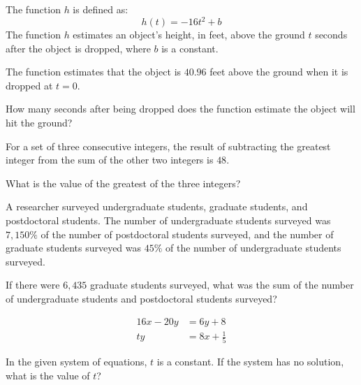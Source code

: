 \noindent\markforreview
\vspace{1em}

The function \(h\) is defined as:
\[
h(t) = -16t^2 + b
\]
The function \(h\) estimates an object's height, in feet, above the ground \(t\) seconds after the object is dropped, where \(b\) is a constant.

The function estimates that the object is \(40.96\) feet above the ground when it is dropped at \(t = 0\).

How many seconds after being dropped does the function estimate the object will hit the ground?

\vspace{2em}
\newpage

\noindent\markforreview
\vspace{1em}

For a set of three consecutive integers, the result of subtracting the greatest integer from the sum of the other two integers is \(48\).

What is the value of the greatest of the three integers?

\vspace{2em}
\newpage

\noindent\markforreview
\vspace{1em}

A researcher surveyed undergraduate students, graduate students, and postdoctoral students. The number of undergraduate students surveyed was \(7{,}150\%\) of the number of postdoctoral students surveyed, and the number of graduate students surveyed was \(45\%\) of the number of undergraduate students surveyed.

If there were \(6{,}435\) graduate students surveyed, what was the sum of the number of undergraduate students and postdoctoral students surveyed?

\vspace{2em}
\newpage

\noindent\markforreview
\vspace{1em}

\[
\begin{aligned}
16x - 20y &= 6y + 8 \\
ty &= 8x + \frac{1}{5}
\end{aligned}
\]

In the given system of equations, \(t\) is a constant. If the system has no solution, what is the value of \(t\)?

\vspace{2em}
\newpage

